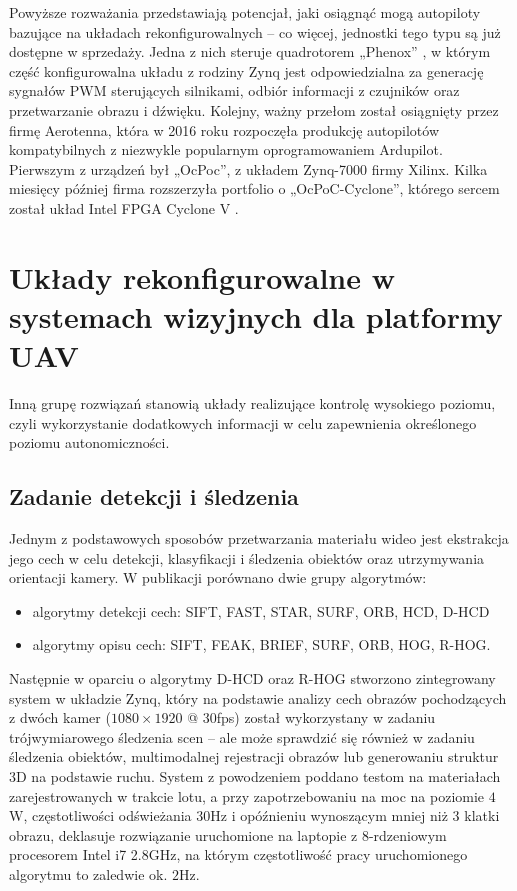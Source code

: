 Powyższe rozważania przedstawiają potencjał, jaki osiągnąć mogą autopiloty bazujące na układach rekonfigurowalnych -- co więcej, jednostki tego typu są już dostępne w sprzedaży. %
Jedna z nich steruje quadrotorem „Phenox” \cite{Konomura}, w którym część konfigurowalna układu z rodziny Zynq jest odpowiedzialna za generację sygnałów PWM sterujących silnikami, odbiór informacji z czujników oraz przetwarzanie obrazu i dźwięku.
Kolejny, ważny przełom został osiągnięty przez firmę Aerotenna, która w 2016 roku rozpoczęła produkcję autopilotów kompatybilnych z niezwykle popularnym oprogramowaniem Ardupilot. 
Pierwszym z urządzeń był „OcPoc”, z układem Zynq-7000 firmy Xilinx. 
Kilka miesięcy później firma rozszerzyła portfolio o „OcPoC-Cyclone”, którego sercem został układ Intel FPGA Cyclone V \cite{Aerotenna}.

\section{Układy rekonfigurowalne w systemach wizyjnych dla platformy UAV}

Inną grupę rozwiązań stanowią układy realizujące kontrolę wysokiego poziomu, czyli wykorzystanie dodatkowych informacji w celu zapewnienia określonego poziomu autonomiczności.
 
\subsection{Zadanie detekcji i śledzenia}
Jednym z podstawowych sposobów przetwarzania materiału wideo jest ekstrakcja jego cech w celu detekcji, klasyfikacji i śledzenia obiektów oraz utrzymywania orientacji kamery. 
W publikacji \cite{RHOG} porównano dwie grupy algorytmów:
\begin{itemize}
	\item algorytmy detekcji cech: SIFT, FAST, STAR, SURF, ORB, HCD, D-HCD
	\item algorytmy opisu cech: SIFT, FEAK, BRIEF, SURF, ORB, HOG, R-HOG.
\end{itemize} 

Następnie w oparciu o algorytmy D-HCD oraz R-HOG stworzono zintegrowany system w układzie Zynq, który na podstawie analizy cech obrazów pochodzących z dwóch kamer ($1080\times 1920$ @ $30$fps) został wykorzystany w zadaniu trójwymiarowego śledzenia scen -- ale może sprawdzić się również w zadaniu śledzenia obiektów, multimodalnej rejestracji obrazów lub generowaniu struktur 3D na podstawie ruchu. 
System z powodzeniem poddano testom na materiałach zarejestrowanych w trakcie lotu, a przy zapotrzebowaniu na moc na poziomie $4$W, częstotliwości odświeżania $30$Hz i opóźnieniu wynoszącym mniej niż $3$ klatki obrazu, deklasuje rozwiązanie uruchomione na laptopie z 8-rdzeniowym procesorem Intel i7 2.8GHz, na którym częstotliwość pracy uruchomionego algorytmu to zaledwie ok. $2$Hz.

